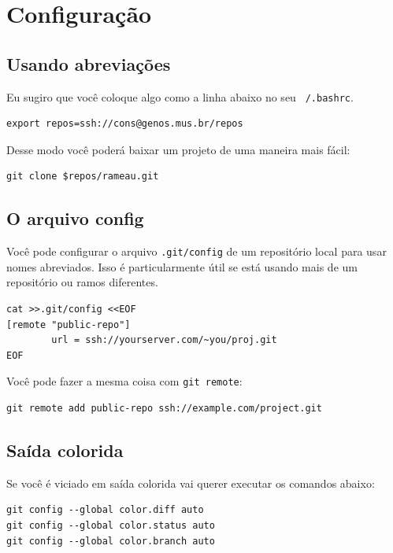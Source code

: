 \documentclass[12pt,brazil]{book}
\begin{document}
\section{Configuração}
\label{sec:configuracao}

\subsection{Usando abreviações}
\label{sec:usando-abreviacoes}

Eu sugiro que você coloque algo como a linha abaixo no seu
\texttt{~/.bashrc}.

\begin{verbatim}
export repos=ssh://cons@genos.mus.br/repos
\end{verbatim}

Desse modo você poderá baixar um projeto de uma maneira mais fácil:

\begin{verbatim}
git clone $repos/rameau.git
\end{verbatim}

\subsection{O arquivo config}
\label{sec:o-arquivo-config}

Você pode configurar o arquivo \texttt{.git/config} de um repositório
local para usar nomes abreviados. Isso é particularmente útil se está
usando mais de um repositório ou ramos diferentes.

\begin{verbatim}
cat >>.git/config <<EOF
[remote "public-repo"]
        url = ssh://yourserver.com/~you/proj.git
EOF
\end{verbatim}

Você pode fazer a mesma coisa com \texttt{git remote}:

\begin{verbatim}
git remote add public-repo ssh://example.com/project.git
\end{verbatim}

\subsection{Saída colorida}
\label{sec:saida-colorida}

Se você é viciado em saída colorida vai querer executar os comandos abaixo:

\begin{verbatim}
git config --global color.diff auto
git config --global color.status auto
git config --global color.branch auto
\end{verbatim}
\end{document}
